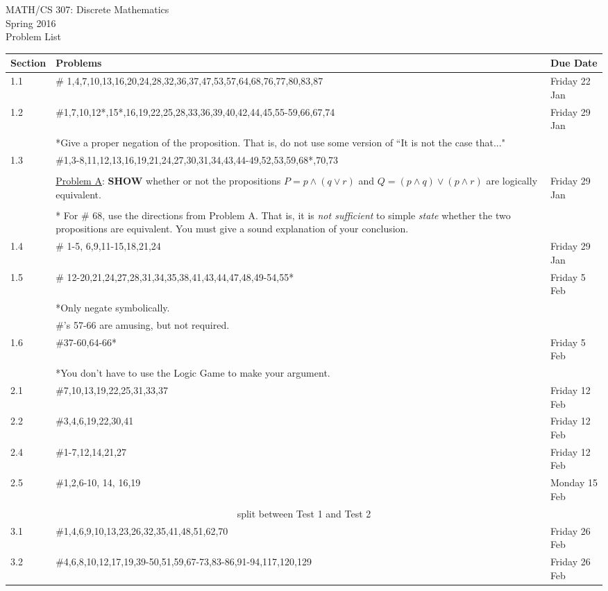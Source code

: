 \documentclass[11pt]{article}
\begin{document}
\begin{center}MATH/CS 307:  Discrete Mathematics \\ Spring 2016 \\ Problem List\end{center}

\hrulefill

\begin{tabular}{|p{1.6cm}|p{12cm}|p{3cm}|}
\hline
Section & Problems & Due Date\\
\hline \hline
1.1 & \# 1,4,7,10,13,16,20,24,28,32,36,37,47,53,57,64,68,76,77,80,83,87& Friday 22 Jan \\
\hline
1.2 & \#1,7,10,12*,15*,16,19,22,25,28,33,36,39,40,42,44,45,55-59,66,67,74 & Friday 29 Jan \\
&*Give a proper negation of the proposition. That is, do not use some version of ``It is not the case that..."&\\
\hline
1.3 & \#1,3-8,11,12,13,16,19,21,24,27,30,31,34,43,44-49,52,53,59,68*,70,73&\\
&&\\
& \underline{Problem A}: \textbf{SHOW} whether or not the propositions $P=p \wedge(q\vee r)$ and $Q=(p \wedge q) \vee (p \wedge r)$ are logically equivalent.&Friday 29 Jan\\
&&\\
& * For \# 68, use the directions from Problem A. That is, it is \emph{not sufficient} to simple \emph{state} whether the two propositions are equivalent. You must give a sound explanation of your conclusion.&\\
\hline
1.4 & \# 1-5, 6,9,11-15,18,21,24& Friday 29 Jan\\
\hline
1.5 & \# 12-20,21,24,27,28,31,34,35,38,41,43,44,47,48,49-54,55*&Friday 5 Feb\\
& *Only negate symbolically. &\\
& \#'s 57-66 are amusing, but not required. & \\
\hline
1.6 & \#37-60,64-66*&Friday 5 Feb\\
&*You don't have to use the Logic Game to make your argument.&\\
\hline
2.1 & \#7,10,13,19,22,25,31,33,37& Friday 12 Feb \\
\hline
2.2 & \#3,4,6,19,22,30,41& Friday 12 Feb\\
\hline
2.4 & \#1-7,12,14,21,27& Friday 12 Feb\\
\hline
2.5 & \#1,2,6-10, 14, 16,19& Monday 15 Feb\\
\hline
\hline
\multicolumn{3}{c}{split between Test 1 and Test 2}\\
\hline
3.1&\#1,4,6,9,10,13,23,26,32,35,41,48,51,62,70& Friday 26 Feb\\
\hline
3.2&\#4,6,8,10,12,17,19,39-50,51,59,67-73,83-86,91-94,117,120,129&Friday 26 Feb\\
\hline

\end{tabular}
\end{document}

